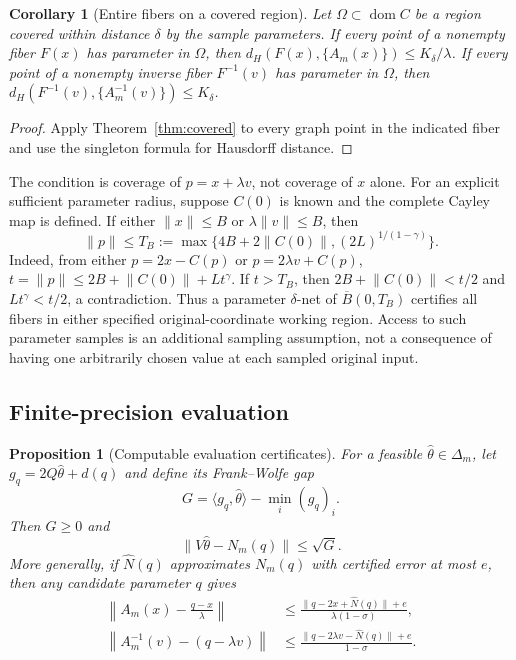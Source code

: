 \documentclass[11pt]{article}
\numberwithin{equation}{section}
\newtheorem{proposition}[theorem]{Proposition}
\newtheorem{corollary}[theorem]{Corollary}
\theoremstyle{definition}
\theoremstyle{remark}
\newcommand{\dom}{\operatorname{dom}}
\newcommand{\ip}[2]{\langle #1,#2\rangle}
\newcommand{\norm}[1]{\lVert #1\rVert}
\begin{document}
\begin{corollary}[Entire fibers on a covered region]\label{cor:coveredfibers}
Let $\Omega\subset\dom C$ be a region covered within distance $\delta$
by the sample parameters. If every point of a nonempty fiber $F(x)$
has parameter in $\Omega$, then
$d_H(F(x),\{A_m(x)\})\le K_\delta/\lambda$. If every point of a
nonempty inverse fiber $F^{-1}(v)$ has parameter in $\Omega$, then
$d_H(F^{-1}(v),\{A_m^{-1}(v)\})\le K_\delta$.
\end{corollary}
\begin{proof}
Apply Theorem~\ref{thm:covered} to every graph point in the indicated
fiber and use the singleton formula for Hausdorff distance.
\end{proof}

The condition is coverage of $p=x+\lambda v$, not coverage of $x$
alone. For an explicit sufficient parameter radius, suppose $C(0)$ is
known and the complete Cayley map is defined. If either
$\norm{x}\le B$ or $\lambda\norm v\le B$, then
\begin{equation}\label{eq:parameterradius}
 \norm p\le
 T_B:=\max\{4B+2\norm{C(0)},(2L)^{1/(1-\gamma)}\}.
\end{equation}
Indeed, from either $p=2x-C(p)$ or $p=2\lambda v+C(p)$,
$t=\norm p\le2B+\norm{C(0)}+Lt^\gamma$. If $t>T_B$, then
$2B+\norm{C(0)}<t/2$ and $Lt^\gamma<t/2$, a contradiction.
Thus a parameter $\delta$-net of $\overline B(0,T_B)$ certifies all
fibers in either specified original-coordinate working region.
Access to such parameter samples is an additional sampling assumption,
not a consequence of having one arbitrarily chosen value at each sampled
original input.

\subsection{Finite-precision evaluation}

\begin{proposition}[Computable evaluation certificates]\label{prop:evaluation}
For a feasible $\widehat\theta\in\Delta_m$, let
$g_q=2Q\widehat\theta+d(q)$ and define its Frank--Wolfe gap
\[
 G=\ip{g_q}{\widehat\theta}-\min_i(g_q)_i.
\]
Then $G\ge0$ and
\begin{equation}\label{eq:qpgap}
 \norm{V\widehat\theta-N_m(q)}\le\sqrt G.
\end{equation}
More generally, if $\widehat N(q)$ approximates $N_m(q)$ with certified
error at most $e$, then any candidate parameter $q$ gives
\begin{align}
 \left\|A_m(x)-\frac{q-x}{\lambda}\right\|
 &\le\frac{\norm{q-2x+\widehat N(q)}+e}
              {\lambda(1-\sigma)},\label{eq:forwardresidual}\\
 \left\|A_m^{-1}(v)-(q-\lambda v)\right\|
 &\le\frac{\norm{q-2\lambda v-\widehat N(q)}+e}
              {1-\sigma}.\label{eq:inverseresidual}
\end{align}
\end{proposition}
\end{document}
